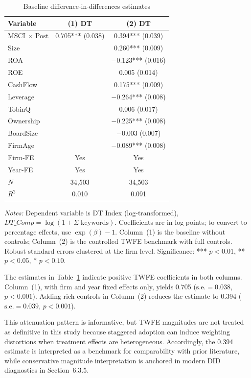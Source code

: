 \begin{table}[htbp]
\centering
\caption{Baseline difference-in-differences estimates}
\label{tab:baseline_did}
\small
\begin{tabular}{lcc}
\toprule
\textbf{Variable} & \textbf{(1) DT} & \textbf{(2) DT} \\
\midrule
MSCI $\times$ Post & 0.705*** (0.038) & 0.394*** (0.039) \\
Size & & 0.260*** (0.009) \\
ROA & & $-$0.123*** (0.016) \\
ROE & & 0.005 (0.014) \\
CashFlow & & 0.175*** (0.009) \\
Leverage & & $-$0.264*** (0.008) \\
TobinQ & & 0.006 (0.017) \\
Ownership & & $-$0.225*** (0.008) \\
BoardSize & & $-$0.003 (0.007) \\
FirmAge & & $-$0.089*** (0.008) \\
Firm-FE & Yes & Yes \\
Year-FE & Yes & Yes \\
$N$ & 34,503 & 34,503 \\
$R^2$ & 0.010 & 0.091 \\
\bottomrule
\end{tabular}
\begin{tablenotes}
\small
\item \textit{Notes:} Dependent variable is DT Index (log-transformed), $DT\_Comp = \log(1 + \Sigma\;\mathrm{keywords})$. Coefficients are in log points; to convert to percentage effects, use $\exp(\beta) - 1$. Column~(1) is the baseline without controls; Column~(2) is the controlled TWFE benchmark with full controls. Robust standard errors clustered at the firm level. Significance: *** $p < 0.01$, ** $p < 0.05$, * $p < 0.10$.
\end{tablenotes}
\end{table}

The estimates in Table~\ref{tab:baseline_did} indicate positive TWFE coefficients in both columns. Column~(1), with firm and year fixed effects only, yields 0.705 ($\mathrm{s.e.} = 0.038$, $p < 0.001$). Adding rich controls in Column~(2) reduces the estimate to 0.394 ($\mathrm{s.e.} = 0.039$, $p < 0.001$).

This attenuation pattern is informative, but TWFE magnitudes are not treated as definitive in this study because staggered adoption can induce weighting distortions when treatment effects are heterogeneous. Accordingly, the 0.394 estimate is interpreted as a benchmark for comparability with prior literature, while conservative magnitude interpretation is anchored in modern DID diagnostics in Section~6.3.5.

